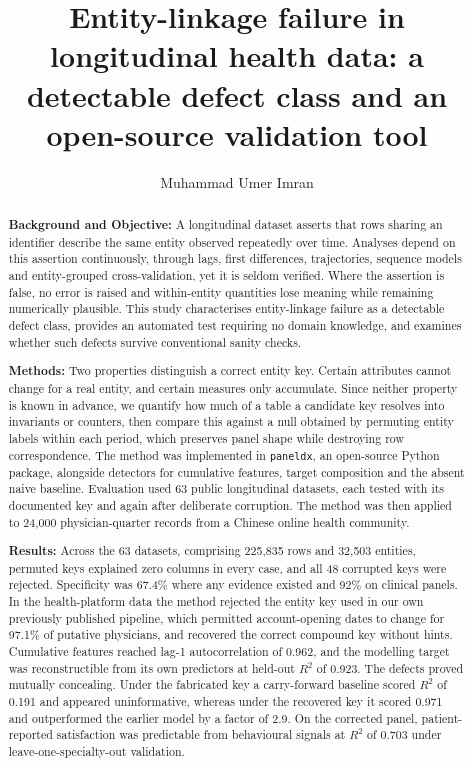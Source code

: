 \documentclass[preprint,12pt]{elsarticle}
\makeatletter
\let\corref\@gobble
\makeatother
\begin{document}
\begin{frontmatter}

\title{Entity-linkage failure in longitudinal health data: a detectable
defect class and an open-source validation tool}

\author[nchu,dex]{Muhammad Umer Imran\corref{cor1}}

\address[nchu]{Clinical Medicine, Nanchang University, Nanchang, China}
\address[dex]{3Dex Inc., Irvine, CA 92617, USA}

\begin{abstract}
\textbf{Background and Objective:} A longitudinal dataset asserts that rows
sharing an identifier describe the same entity observed repeatedly over time.
Analyses depend on this assertion continuously, through lags, first differences,
trajectories, sequence models and entity-grouped cross-validation, yet it is
seldom verified. Where the assertion is false, no error is raised and
within-entity quantities lose meaning while remaining numerically plausible.
This study characterises entity-linkage failure as a detectable defect class,
provides an automated test requiring no domain knowledge, and examines whether
such defects survive conventional sanity checks.

\textbf{Methods:} Two properties distinguish a correct entity key. Certain
attributes cannot change for a real entity, and certain measures only
accumulate. Since neither property is known in advance, we quantify how much of
a table a candidate key resolves into invariants or counters, then compare this
against a null obtained by permuting entity labels within each period, which
preserves panel shape while destroying row correspondence. The method was
implemented in \texttt{paneldx}, an open-source Python package, alongside
detectors for cumulative features, target composition and the absent naive
baseline. Evaluation used 63 public longitudinal datasets, each tested with its
documented key and again after deliberate corruption. The method was then
applied to 24{,}000 physician-quarter records from a Chinese online health
community.

\textbf{Results:} Across the 63 datasets, comprising 225{,}835 rows and
32{,}503 entities, permuted keys explained zero columns in every case, and all
48 corrupted keys were rejected. Specificity was 67.4\% where any evidence
existed and 92\% on clinical panels. In the health-platform data the method
rejected the entity key used in our own previously published pipeline, which
permitted account-opening dates to change for 97.1\% of putative physicians,
and recovered the correct compound key without hints. Cumulative features
reached lag-1 autocorrelation of 0.962, and the modelling target was
reconstructible from its own predictors at held-out $R^2$ of 0.923. The defects
proved mutually concealing. Under the fabricated key a carry-forward baseline
scored $R^2$ of 0.191 and appeared uninformative, whereas under the recovered
key it scored 0.971 and outperformed the earlier model by a factor of 2.9. On
the corrected panel, patient-reported satisfaction was predictable from
behavioural signals at $R^2$ of 0.703 under leave-one-specialty-out validation.


\end{abstract}
\end{frontmatter}
\end{document}
